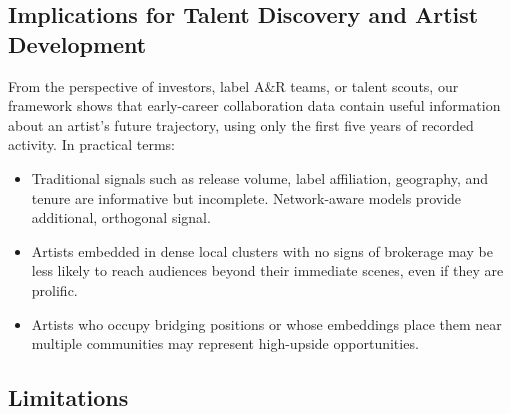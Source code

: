 \documentclass[fleqn,10pt]{wlscirep}
\begin{document}
\subsection*{Implications for Talent Discovery and Artist Development}

From the perspective of investors, label A\&R teams, or talent scouts, our framework shows that early-career collaboration data contain useful information about an artist’s future trajectory, using only the first five years of recorded activity. In practical terms:

\begin{itemize}
    \item Traditional signals such as release volume, label affiliation, geography, and tenure are informative but incomplete. Network-aware models provide additional, orthogonal signal.
    \item Artists embedded in dense local clusters with no signs of brokerage may be less likely to reach audiences beyond their immediate scenes, even if they are prolific.
    \item Artists who occupy bridging positions or whose embeddings place them near multiple communities may represent high-upside opportunities.
\end{itemize}

\subsection*{Limitations}
\end{document}
